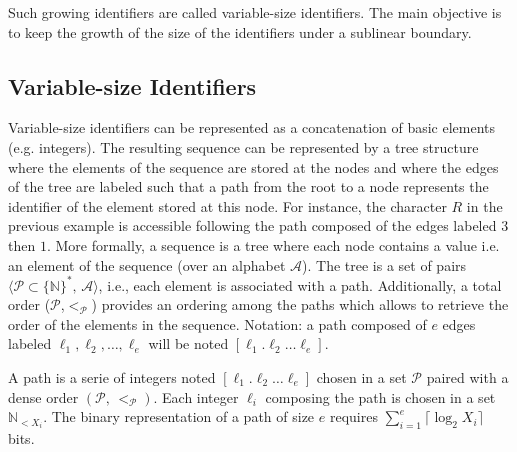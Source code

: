 
Such growing identifiers are called variable-size identifiers. The main
objective is to keep the growth of the size of the identifiers under a sublinear
boundary.

\subsection{Variable-size Identifiers}
\label{subsec:variable}

Variable-size identifiers can be represented as a concatenation of basic
elements (e.g. integers). The resulting sequence can be represented by a tree
structure where the elements of the sequence are stored at the nodes and where
the edges of the tree are labeled such that a path from the root to a node
represents the identifier of the element stored at this node. For instance, the
character $R$ in the previous example is accessible following the path composed
of the edges labeled $3$ then $1$. More formally, a sequence is a tree where
each node contains a value i.e. an element of the sequence (over an alphabet
$\mathcal{A}$). The tree is a set of pairs
$\langle\mathcal{P}\subset\{\mathbb{N}\}^*,\, \mathcal{A} \rangle$, i.e., each
element is associated with a path. Additionally, a total order
($\mathcal{P}$,$<_{\mathcal{P}}$) provides an ordering among the paths which
allows to retrieve the order of the elements in the sequence. Notation: a path
composed of $e$ edges labeled $\ell_1,\ell_2,\ldots,\ell_e$ will be noted
$[\ell_1.\ell_2\ldots\ell_e]$.

\begin{definition}[Path]
  A path is a serie of integers noted $[\ell_1.\ell_2\ldots \ell_e]$ chosen in a
  set $\mathcal{P}$ paired with a dense order $(\mathcal{P},\, <_\mathcal{P})$.
  Each integer $\ell_i$ composing the path is chosen in a set
  $\mathbb{N}_{<X_i}$. The binary representation of a path of size $e$ requires
  $\textstyle \sum\nolimits_{i=1}^e \lceil \log_2 X_i\rceil$ bits.
\end{definition}


